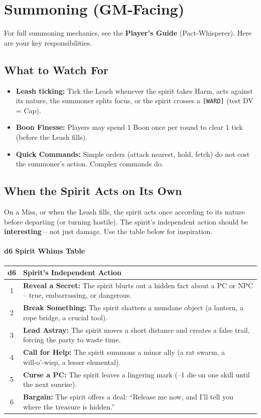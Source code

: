 \section{Summoning (GM‑Facing)}
\label{sec:summoning-gm}

For full summoning mechanics, see the \textbf{Player's Guide} (Pact‑Whisperer). Here are your key responsibilities.

\subsection*{What to Watch For}
\begin{itemize}
  \item \textbf{Leash ticking:} Tick the Leash whenever the spirit takes Harm, acts against its nature, the summoner splits focus, or the spirit crosses a \texttt{[WARD]} (test DV = Cap).
  \item \textbf{Boon Finesse:} Players may spend 1 Boon once per round to clear 1 tick (before the Leash fills).
  \item \textbf{Quick Commands:} Simple orders (attack nearest, hold, fetch) do not cost the summoner’s action. Complex commands do.
\end{itemize}

\subsection*{When the Spirit Acts on Its Own}
On a Miss, or when the Leash fills, the spirit acts once according to its nature before departing (or turning hostile). The spirit’s independent action should be \textbf{interesting} – not just damage. Use the table below for inspiration.

\paragraph{d6 Spirit Whims Table}
\label{subsec:spirit-whims}
\begin{center}
\begin{tabular}{cl}
\toprule
\textbf{d6} & \textbf{Spirit’s Independent Action} \\
\midrule
1 & \textbf{Reveal a Secret:} The spirit blurts out a hidden fact about a PC or NPC – true, embarrassing, or dangerous. \\
2 & \textbf{Break Something:} The spirit shatters a mundane object (a lantern, a rope bridge, a crucial tool). \\
3 & \textbf{Lead Astray:} The spirit moves a short distance and creates a false trail, forcing the party to waste time. \\
4 & \textbf{Call for Help:} The spirit summons a minor ally (a rat swarm, a will‑o’‑wisp, a lesser elemental). \\
5 & \textbf{Curse a PC:} The spirit leaves a lingering mark (–1 die on one skill until the next sunrise). \\
6 & \textbf{Bargain:} The spirit offers a deal: “Release me now, and I’ll tell you where the treasure is hidden.” \\
\bottomrule
\end{tabular}
\end{center}

